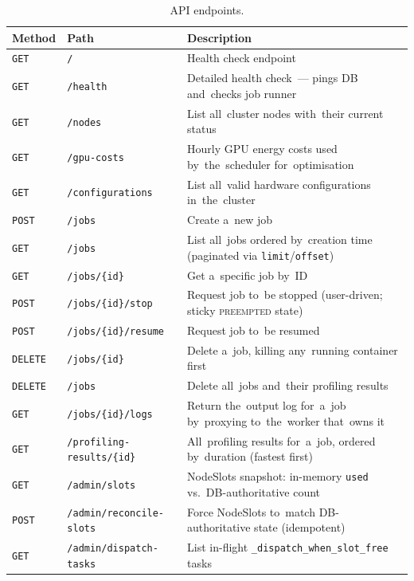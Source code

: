 \begin{table}[H]
\centering
\begin{tabularx}{\textwidth}{@{}l l X@{}}
\toprule
\textbf{Method} & \textbf{Path} & \textbf{Description} \\
\midrule
\texttt{GET}    & \texttt{/}                            & Health check endpoint \\
\texttt{GET}    & \texttt{/health}                      & Detailed health check~--- pings DB and~checks job runner \\
\texttt{GET}    & \texttt{/nodes}                       & List all~cluster nodes with~their current status \\
\texttt{GET}    & \texttt{/gpu-costs}                   & Hourly GPU energy costs used by~the~scheduler for~optimisation \\
\texttt{GET}    & \texttt{/configurations}              & List all~valid hardware configurations in~the~cluster \\
\texttt{POST}   & \texttt{/jobs}                        & Create a~new job \\
\texttt{GET}    & \texttt{/jobs}                        & List all~jobs ordered by~creation time (paginated via \texttt{limit}/\texttt{offset}) \\
\texttt{GET}    & \texttt{/jobs/\{id\}}                 & Get a~specific job by~ID \\
\texttt{POST}   & \texttt{/jobs/\{id\}/stop}            & Request job to~be stopped (user-driven; sticky \textsc{preempted} state) \\
\texttt{POST}   & \texttt{/jobs/\{id\}/resume}          & Request job to~be resumed \\
\texttt{DELETE} & \texttt{/jobs/\{id\}}                 & Delete a~job, killing any~running container first \\
\texttt{DELETE} & \texttt{/jobs}                        & Delete all~jobs and~their profiling results \\
\texttt{GET}    & \texttt{/jobs/\{id\}/logs}            & Return the~output log for~a~job by~proxying to~the~worker that~owns it \\
\texttt{GET}    & \texttt{/profiling-results/\{id\}}    & All~profiling results for~a~job, ordered by~duration (fastest first) \\
\texttt{GET}    & \texttt{/admin/slots}                 & NodeSlots snapshot: in-memory \texttt{used} vs.\ DB-authoritative count \\
\texttt{POST}   & \texttt{/admin/reconcile-slots}       & Force NodeSlots to~match DB-authoritative state (idempotent) \\
\texttt{GET}    & \texttt{/admin/dispatch-tasks}        & List in-flight \texttt{\_dispatch\_when\_slot\_free} tasks \\
\bottomrule
\end{tabularx}
\caption{API endpoints.}\label{tab:api-endpoints}
\end{table}

